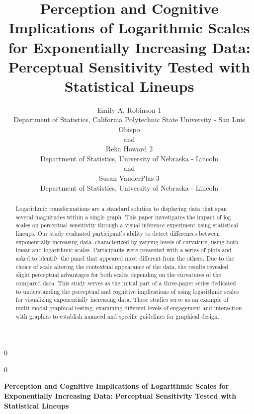 \documentclass[12pt]{article}
\newcommand{\blind}{0}
\begin{document}
\def\spacingset#1{\renewcommand{\baselinestretch}%
{#1}\small\normalsize} \spacingset{1}



\blind
{
  \title{\bf Perception and Cognitive Implications of Logarithmic Scales
for Exponentially Increasing Data: Perceptual Sensitivity Tested with
Statistical Lineups}

  \author{
        Emily A. Robinson 1 \\
    Department of Statistics, California Polytechnic State University -
San Luis Obispo\\
     and \\     Reka Howard 2 \\
    Department of Statistics, University of Nebraska - Lincoln\\
     and \\     Susan VanderPlas 3 \\
    Department of Statistics, University of Nebraska - Lincoln\\
      }
  \maketitle
} \fi

\blind
{
  \bigskip
  \bigskip
  \bigskip
  \begin{center}
    {\LARGE\bf Perception and Cognitive Implications of Logarithmic
Scales for Exponentially Increasing Data: Perceptual Sensitivity Tested
with Statistical Lineups}
  \end{center}
  \medskip
} \fi

\bigskip
\begin{abstract}
Logarithmic transformations are a standard solution to displaying data
that span several magnitudes within a single graph. This paper
investigates the impact of log scales on perceptual sensitivity through
a visual inference experiment using statistical lineups. Our study
evaluated participant's ability to detect differences between
exponentially increasing data, characterized by varying levels of
curvature, using both linear and logarithmic scales. Participants were
presented with a series of plots and asked to identify the panel that
appeared most different from the others. Due to the choice of scale
altering the contextual appearance of the data, the results revealed
slight perceptual advantages for both scales depending on the curvatures
of the compared data. This study serves as the initial part of a
three-paper series dedicated to understanding the perceptual and
cognitive implications of using logarithmic scales for visualizing
exponentially increasing data. These studies serve as an example of
multi-modal graphical testing, examining different levels of engagement
and interaction with graphics to establish nuanced and specific
guidelines for graphical design.
\end{abstract}
\end{document}
